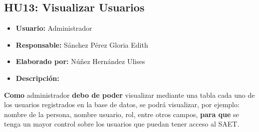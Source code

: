 \subsection{HU13: Visualizar Usuarios}
\begin{itemize}
	\item \textbf{Usuario:} Administrador
	\item \textbf{Responsable:} Sánchez Pérez Gloria Edith
	\item \textbf{Elaborado por:} Núñez Hernández Ulises
	\item \textbf{Descripción:}
\end{itemize}
\textbf{Como} administrador \textbf{debo de poder} visualizar mediante una tabla cada uno de los usuarios registrados en la base de datos, se podrá visualizar, por ejemplo: nombre de la persona, nombre usuario, rol, entre otros campos, \textbf{para que} se tenga un mayor control sobre los usuarios que puedan tener acceso al SAET.